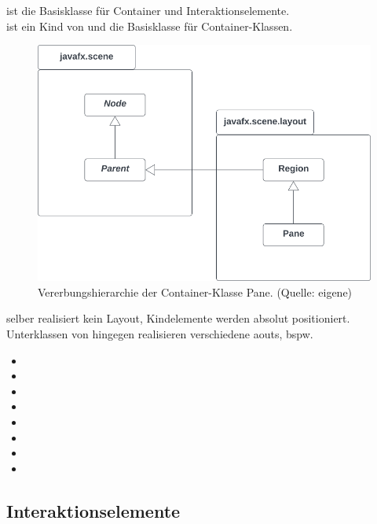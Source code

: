  ist die Basisklasse für Container und Interaktionselemente.\\

\noindent
{} ist ein Kind von  und die Basisklasse für Container-Klassen.

\begin{figure}
    \centering
    \includegraphics[scale=0.5]{chapters/fopt3/img/javafx/pane}
    \caption{Vererbungshierarchie der Container-Klasse Pane. (Quelle: eigene)}
    \label{fig:pane}
\end{figure}

\noindent
{} selber realisiert kein Layout, Kindelemente werden absolut positioniert.\\

\noindent
Unterklassen von  hingegen realisieren verschiedene aouts, bspw.

\begin{itemize}
    \item {}
    \item {}
    \item {}
    \item {}
    \item {}
    \item {}
    \item {}
    \item {}
\end{itemize}


\subsection{Interaktionselemente}

